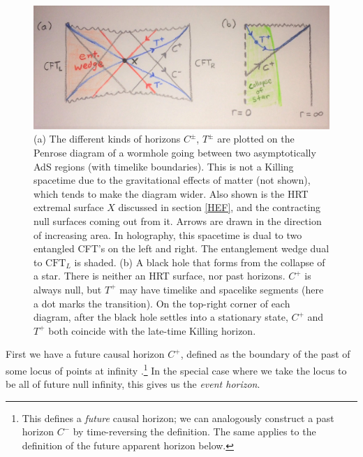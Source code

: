 \documentclass[12pt,a4paper]{article}
\begin{document}
\begin{figure}[ht]
\centering
\includegraphics[width=.8\textwidth]{horizons.jpg}
\caption{\small (a) The different kinds of horizons $C^\pm$, $T^\pm$ are plotted on the Penrose diagram of a wormhole going between two asymptotically AdS regions (with timelike boundaries).  This is not a Killing spacetime due to the gravitational effects of matter (not shown), which tends to make the diagram wider.  Also shown is the HRT extremal surface $X$ discussed in section \ref{HEF}, and the contracting null surfaces coming out from it.  Arrows are drawn in the direction of increasing area.  In holography, this spacetime is dual to two entangled CFT's on the left and right.  The entanglement wedge dual to $\text{CFT}_L$ is shaded.  
(b) A black hole that forms from the collapse of a star.  There is neither an HRT surface, nor past horizons.  $C^+$ is always null, but $T^+$ may have timelike and spacelike segments (here a dot marks the transition).  On the top-right corner of each diagram, after the black hole settles into a stationary state, $C^+$ and $T^+$ both coincide with the late-time Killing horizon.}
\label{fig:horizons}
\end{figure}

First we have a future causal horizon $C^+$, defined as the boundary of the past of some locus of points at infinity \cite{jacobson2003horizon,wall2013generalized}.\footnote{This defines a \emph{future} causal horizon; we can analogously construct a past horizon $C^-$ by time-reversing the definition. The same applies to the definition of the future apparent horizon below.} In the special case where we take the locus to be all of future null infinity, this gives us the \emph{event horizon}.
\end{document}
